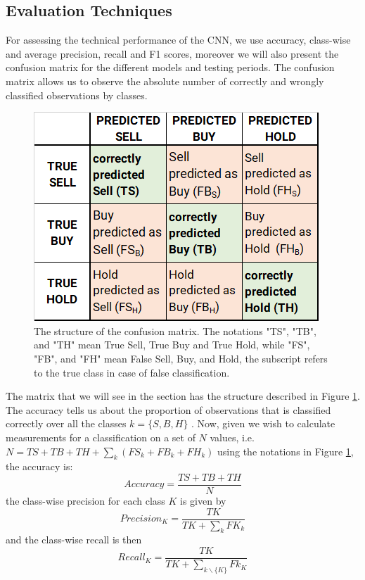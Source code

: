 \documentclass[11pt, a4paper]{article}
\begin{document}
\subsection{Evaluation Techniques}
\label{subsec:DM:Eval}

For assessing the technical performance of the CNN, we use accuracy, class-wise and average precision, recall and F1 scores, moreover we will also present the confusion matrix for the different models and testing periods. 
The confusion matrix allows us to observe the absolute number of correctly and wrongly classified observations by classes. 
\begin{figure}[ht]
    \centering
    \includegraphics[width=.5\textwidth]{images/Confusion_matrix.png}
    \caption{The structure of the confusion matrix. The notations "TS", "TB", and "TH" mean True Sell, True Buy and True Hold, while "FS", "FB", and "FH" mean False Sell, Buy, and Hold, the subscript refers to the true class in case of false classification.}
    \label{fig:cmdef}
\end{figure}
The matrix that we will see in the section  has the structure described in Figure \ref{fig:cmdef}.
The accuracy tells us about the proportion of observations that is classified correctly over all the classes $k = \{S, B, H\}$ . Now, given we wish to calculate measurements for a classification on a set of $N$ values, i.e. $N = TS + TB + TH + \sum_k \left(FS_k + FB_k + FH_k\right)$ using the notations in Figure \ref{fig:cmdef}, the accuracy is:
\begin{equation}
    \label{eq:acc}
    Accuracy = \frac{TS + TB + TH}{N}
\end{equation}
the class-wise precision for each class $K$ is given by
\begin{equation}
    \label{eq:pr}
    Precision_K = \frac{TK}{TK +  \sum_k FK_k}
\end{equation}
and the class-wise recall is then 
\begin{equation}
    \label{eq:rec}
    Recall_K = \frac{TK}{TK +  \sum_{k  \smallsetminus \{K\}} Fk_K}
\end{equation}
\end{document}
